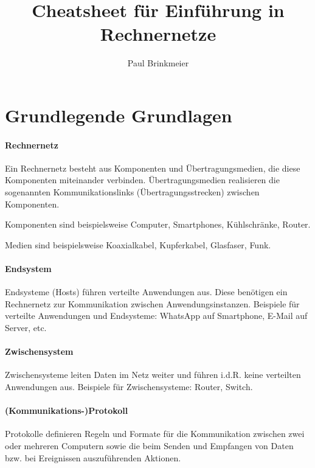 \documentclass[a4paper, 14pt]{article}
\author{Paul Brinkmeier}
\title{Cheatsheet für Einführung in Rechnernetze}
\begin{document}
	\maketitle
	\newpage
	\tableofcontents
	\newpage


	\section{Grundlegende Grundlagen}

	\paragraph{Rechnernetz}

	Ein Rechnernetz besteht aus Komponenten und Übertragungsmedien, die diese Komponenten miteinander verbinden.
	Übertragungsmedien realisieren die sogenannten Kommunikationslinks (Übertragungsstrecken) zwischen Komponenten.

	Komponenten sind beispielsweise Computer, Smartphones, Kühlschränke, Router.

	Medien sind beispielsweise Koaxialkabel, Kupferkabel, Glasfaser, Funk.

	\paragraph{Endsystem}

	Endsysteme (Hosts) führen verteilte Anwendungen aus.
	Diese benötigen ein Rechnernetz zur Kommunikation zwischen Anwendungsinstanzen.
	Beispiele für verteilte Anwendungen und Endsysteme: WhatsApp auf Smartphone, E-Mail auf Server, etc.

	\paragraph{Zwischensystem}

	Zwischensysteme leiten Daten im Netz weiter und führen i.d.R. keine verteilten Anwendungen aus.
	Beispiele für Zwischensysteme: Router, Switch.

	\paragraph{(Kommunikations-)Protokoll}

	Protokolle definieren Regeln und Formate für die Kommunikation zwischen zwei oder mehreren Computern sowie die beim Senden und Empfangen von Daten bzw. bei Ereignissen auszuführenden Aktionen.
\end{document}
